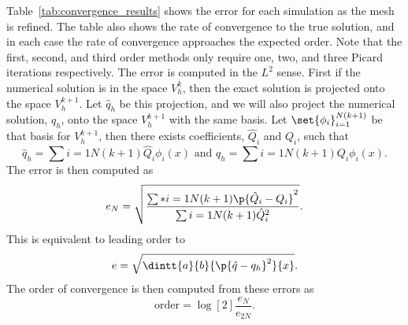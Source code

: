 Table~\ref{tab:convergence_results} shows the error for each simulation as the mesh
is refined.
The table also shows the rate of convergence to the true solution, and in each case
the rate of convergence approaches the expected order.
Note that the first, second, and third order methods only require one, two, and
three Picard iterations respectively.
The error is computed in the \(L^2\) sense.
First if the numerical solution is in the space \(V_h^k\), then the exact solution
is projected onto the space \(V_h^{k+1}\).
Let \(\hat{q}_h\) be this projection, and we will also project the numerical
solution, \(q_h\), onto the space \(V_h^{k+1}\) with the same basis.
Let \(\set{\phi_i}_{i=1}^{N(k+1)}\) be that basis for \(V_h^{k+1}\), then
there exists coefficients, \(\hat{Q}_i\) and \(Q_i\), such that
\begin{equation}
  \hat{q}_h = \sum{i = 1}{N(k+1)}{\hat{Q}_i \phi_i(x)} \text{ and }
  q_h = \sum{i = 1}{N(k+1)}{Q_i \phi_i(x)}.
\end{equation}
The error is then computed as
\begin{equation}
  e_N = \sqrt{\frac{\sum*{i = 1}{N(k+1)}{\p{\hat{Q}_i - Q_i}^2}}{\sum{i=1}{N(k+1)}{\hat{Q}_i^2}}}.
\end{equation}
This is equivalent to leading order to
\begin{equation}
  e = \sqrt{\dintt{a}{b}{\p{\hat{q} - q_h}^2}{x}}.
\end{equation}
The order of convergence is then computed from these errors as
\begin{equation}
  \text{order} = \log[2]{\frac{e_N}{e_{2N}}}.
\end{equation}

